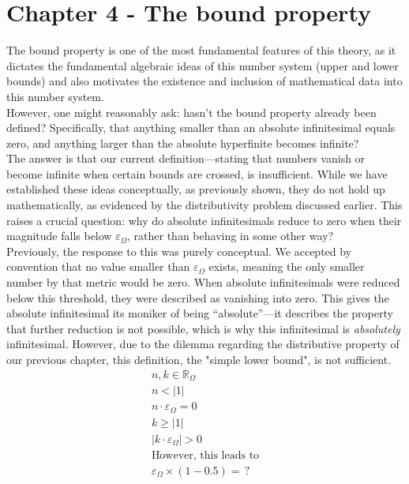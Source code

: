 \documentclass{article}
\begin{document}
\section{Chapter 4 - The bound property}

The bound property is one of the most fundamental features of this theory, as it dictates the fundamental algebraic ideas of this number system (upper and lower bounds) and also motivates the existence and inclusion of mathematical data into this number system.\\However, one might reasonably ask: hasn't the bound property already been defined? Specifically, that anything smaller than an absolute infinitesimal equals zero, and anything larger than the absolute hyperfinite becomes infinite?\\The answer is that our current definition---stating that numbers vanish or become infinite when certain bounds are crossed, is insufficient. While we have established these ideas conceptually, as previously shown, they do not hold up mathematically, as evidenced by the distributivity problem discussed earlier. This raises a crucial question: why do absolute infinitesimals reduce to zero when their magnitude falls below $\varepsilon_\Omega$, rather than behaving in some other way?\\Previously, the response to this was purely conceptual. We accepted by convention that no value smaller than $\varepsilon_\Omega$ exists, meaning the only smaller number by that metric would be zero. When absolute infinitesimals were reduced below this threshold, they were described as vanishing into zero. This gives the absolute infinitesimal its moniker of being ``absolute''---it describes the property that further reduction is not possible, which is why this infinitesimal is \textit{absolutely} infinitesimal. However, due to the dilemma regarding the distributive property of our previous chapter, this definition, the "simple lower bound", is not sufficient.
\begin{gather*}
n, k \in \mathbb{R}_\Omega \\
n < |1| \\
n \cdot \varepsilon_\Omega = 0 \\
k \geq |1| \\
|k \cdot \varepsilon_\Omega| > 0 \\
\text{However, this leads to} \\
\varepsilon_\Omega \times (1 - 0.5) = \, ?
\end{gather*}
\end{document}
